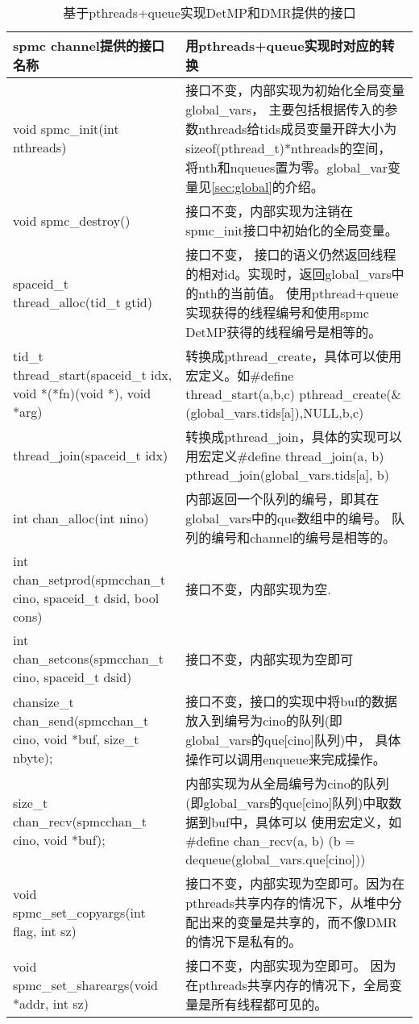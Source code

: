 \begin{table}[!h]
\begin{footnotesize}
  \caption{基于pthreads+queue实现DetMP和DMR提供的接口}
  \begin{tabularx}{1.2\textwidth}{|p{}|p{}|}
  \hline
  \textbf{spmc channel提供的接口名称} & \textbf{用pthreads+queue实现时对应的转换}\\
  \hline
  void spmc\_init(int nthreads) & 接口不变，内部实现为初始化全局变量global\_vars，
  主要包括根据传入的参数nthreads给tids成员变量开辟大小为sizeof(pthread\_t)*nthreads的空间，
  将nth和nqueues置为零。global\_var变量见\ref{sec:global}的介绍。\\
  \hline   
  void spmc\_destroy() &接口不变，内部实现为注销在spmc\_init接口中初始化的全局变量。 \\
  \hline
  spaceid\_t thread\_alloc(tid\_t gtid) & 
  接口不变， 接口的语义仍然返回线程的相对id。实现时，返回global\_vars中的nth的当前值。
  使用pthread+queue实现获得的线程编号和使用spmc DetMP获得的线程编号是相等的。\\  
  \hline
  tid\_t thread\_start(spaceid\_t idx, void *(*fn)(void *), void *arg) & 转换成pthread\_create，具体可以使用宏定义。如\#define thread\_start(a,b,c) pthread\_create(\&(global\_vars.tids[a]),NULL,b,c)\\
  \hline
  thread\_join(spaceid\_t idx) & 转换成pthread\_join，具体的实现可以用宏定义\#define thread\_join(a, b) pthread\_join(global\_vars.tids[a], b)\\
  \hline
  int chan\_alloc(int nino)& 内部返回一个队列的编号，即其在global\_vars中的que数组中的编号。
  队列的编号和channel的编号是相等的。\\  
  \hline
   int chan\_setprod(spmcchan\_t cino, spaceid\_t dsid, bool cons) & 接口不变，内部实现为空.
  \\
  \hline
  int chan\_setcons(spmcchan\_t cino, spaceid\_t dsid) & 接口不变，内部实现为空即可
  \\
  \hline
  chansize\_t chan\_send(spmcchan\_t cino, void *buf, size\_t nbyte); & 
  接口不变，接口的实现中将buf的数据放入到编号为cino的队列(即global\_vars的que[cino]队列)中，
  具体操作可以调用enqueue来完成操作。\\
  \hline
  size\_t chan\_recv(spmcchan\_t cino, void *buf); & 
  内部实现为从全局编号为cino的队列(即global\_vars的que[cino]队列)中取数据到buf中，具体可以
  使用宏定义，如\#define chan\_recv(a, b) (b = dequeue(global\_vars.que[cino]))\\ 
  \hline 
  void spmc\_set\_copyargs(int flag, int sz) & 接口不变，内部实现为空即可。因为在pthreads共享内存的情况下，从堆中分配出来的变量是共享的，而不像DMR的情况下是私有的。\\
  \hline
  void spmc\_set\_shareargs(void *addr, int sz) & 接口不变，内部实现为空即可。
   因为在pthreads共享内存的情况下，全局变量是所有线程都可见的。\\  
  \hline
 \end{tabularx}
\label{tab:MapInter}
\end{footnotesize}
\end{table}

